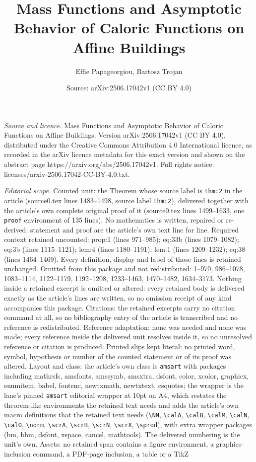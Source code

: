 \documentclass[10pt,a4paper]{amsart}
\title[Mass Functions and Asymptotic Behavior of Caloric Functions ]{Mass Functions and Asymptotic Behavior of Caloric Functions on Affine Buildings}
\author{Effie Papageorgiou, Bartosz Trojan}
\date{Source: arXiv:2506.17042v1 (CC BY 4.0)}
\begin{document}
\maketitle

\noindent\emph{Source and licence.} Mass Functions and Asymptotic Behavior of Caloric Functions on Affine Buildings. Version arXiv:2506.17042v1 (CC BY 4.0), distributed under the Creative Commons Attribution 4.0 International licence, as recorded in the arXiv licence metadata for this exact version and shown on the abstract page https://arxiv.org/abs/2506.17042v1. Full rights notice: licenses/arxiv-2506.17042-CC-BY-4.0.txt.\par\smallskip

\noindent\textit{Editorial scope.} Counted unit: the Theorem whose source label is \texttt{thm:2} in the article (source0.tex lines 1483--1498, source label \texttt{thm:2}), delivered together with the article's own complete original proof of it (source0.tex lines 1499--1633, one \texttt{proof} environment of 135 lines). No mathematics is written, repaired or re-derived: statement and proof are the article's own text line for line. Required context retained uncounted: prop:1 (lines 971--985); eq:33b (lines 1079--1082); eq:3b (lines 1115--1121); lem:4 (lines 1180--1191); lem:1 (lines 1209--1232); eq:38 (lines 1464--1469). Every definition, display and label of those lines is retained unchanged. Omitted from this package and not redistributed: 1--970, 986--1078, 1083--1114, 1122--1179, 1192--1208, 1233--1463, 1470--1482, 1634--3173. Nothing inside a retained excerpt is omitted or altered: every retained body is delivered exactly as the article's lines are written, so no omission receipt of any kind accompanies this package. Citations: the retained excerpts carry no citation command at all, so no bibliography entry of the article is transcribed and no reference is redistributed. Reference adaptation: none was needed and none was made; every reference inside the delivered unit resolves inside it, so no unresolved reference or citation is produced. Printed slips kept literal: no printed word, symbol, hypothesis or number of the counted statement or of its proof was altered. Layout and class: the article's own class is \texttt{amsart} with packages including mathrsfs, amsfonts, amssymb, amsxtra, dsfont, color, xcolor, graphicx, enumitem, babel, fontenc, newtxmath, newtxtext, csquotes; the wrapper is the lane's pinned \texttt{amsart} editorial wrapper at 10pt on A4, which restates the theorem-like environments the retained text needs and adds the article's own macro definitions that the retained text needs (\texttt{\textbackslash NN}, \texttt{\textbackslash calA}, \texttt{\textbackslash calB}, \texttt{\textbackslash calM}, \texttt{\textbackslash calN}, \texttt{\textbackslash calO}, \texttt{\textbackslash norm}, \texttt{\textbackslash scrA}, \texttt{\textbackslash scrB}, \texttt{\textbackslash scrN}, \texttt{\textbackslash scrX}, \texttt{\textbackslash sprod}), with extra wrapper packages (bm, bbm, dsfont, xspace, cancel, mathtools). The delivered numbering is the unit's own. Assets: no retained span contains a figure environment, a graphics-inclusion command, a PDF-page inclusion, a table or a TikZ 
\end{document}
